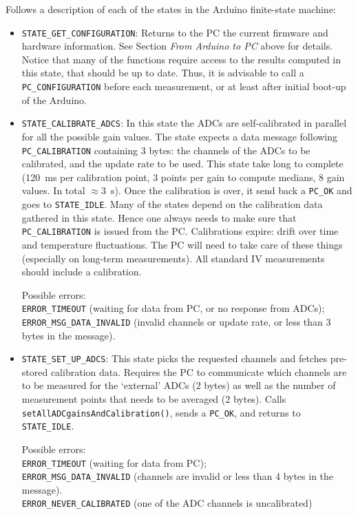 \documentclass[11pt,a4paper,english]{article}
\begin{document}
\vspace*{\baselineskip}
\noindent{}Follows a description of each of the states in the Arduino finite-state machine:
\begin{itemize}
\item \texttt{STATE\_GET\_CONFIGURATION}: Returns to the PC the current firmware and hardware information. See Section \textit{From Arduino to PC} above for details. Notice that many of the functions require access to the results computed in this state, that should be up to date. Thus, it is advisable to call a \texttt{PC\_CONFIGURATION} before each measurement, or at least after initial boot-up of the Arduino.

\item \texttt{STATE\_CALIBRATE\_ADCS}: In this state the ADCs are self-calibrated in parallel for all the possible gain values. The state expects a data message following \texttt{PC\_CALIBRATION} containing 3 bytes: the channels of the ADCs to be calibrated, and the update rate to be used. This state take long to complete (120~ms per calibration point, 3 points per gain to compute medians, 8 gain values. In total $\approx3$~s). Once the calibration is over, it send back a \texttt{PC\_OK} and goes to \texttt{STATE\_IDLE}. Many of the states depend on the calibration data gathered in this state. Hence one always needs to make sure that \texttt{PC\_CALIBRATION} is issued from the PC. Calibrations expire: drift over time and temperature fluctuations. The PC will need to take care of these things (especially on long-term measurements). All standard IV measurements should include a calibration.

    Possible errors:\\\texttt{ERROR\_TIMEOUT} (waiting for data from PC, or no response from ADCs);\\\texttt{ERROR\_MSG\_DATA\_INVALID} (invalid channels or update rate, or less than 3 bytes in the message).

\item \texttt{STATE\_SET\_UP\_ADCS}: This state picks the requested channels and fetches pre-stored calibration data. Requires the PC to communicate which channels are to be measured for the `external' ADCs (2 bytes) as well as the number of measurement points that needs to be averaged (2 bytes). Calls \texttt{setAllADCgainsAndCalibration()}, sends a \texttt{PC\_OK}, and returns to \texttt{STATE\_IDLE}.

	Possible errors:\\\texttt{ERROR\_TIMEOUT} (waiting for data from PC);\\\texttt{ERROR\_MSG\_DATA\_INVALID} (channels are invalid or less than 4 bytes in the message).\\\texttt{ERROR\_NEVER\_CALIBRATED} (one of the ADC channels is uncalibrated)


\end{itemize}
\end{document}
